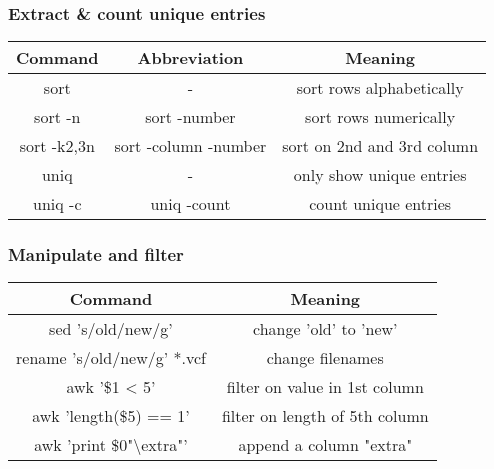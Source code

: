 \documentclass[]{beamer}
\newcommand\Fontlarge{\fontsize{12}{30.4}\selectfont}
\begin{document}

\begin{frame}
\frametitle{Extract \& count unique entries}

\Fontlarge
\begin{table}[h]
\begin{tabular}{ccc}
\textbf{Command} & \textbf{Abbreviation} & \textbf{Meaning} \\ \hline
sort                 & -                     & sort rows alphabetically \\ \hline
sort -n              & sort -number          & sort rows numerically \\ \hline
sort -k2,3n          & sort -column -number  & sort on 2nd and 3rd column \\ \hline
uniq                 & -                     & only show unique entries \\ \hline   
uniq -c              & uniq -count           & count unique entries  
\end{tabular}
\end{table}

\end{frame}


\begin{frame}
\frametitle{Manipulate and filter}

\Fontlarge
\begin{table}[h]
\begin{tabular}{cc}
\textbf{Command} & \textbf{Meaning} \\ \hline
sed 's/old/new/g' & change 'old' to 'new' \\ \hline
rename 's/old/new/g' *.vcf & change filenames \\ \hline
awk '\$1 < 5'        & filter on value in 1st column \\ \hline
awk 'length(\$5) == 1' & filter on length of 5th column \\ \hline   
awk '{print \$0"\textbackslash extra"}' & append a column "extra"    
\end{tabular}
\end{table}

\end{frame}

\end{document}
